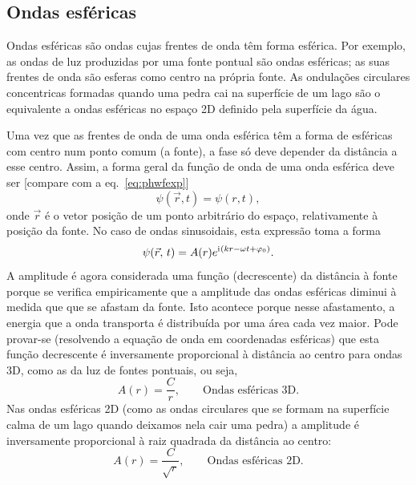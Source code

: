 \subsection{Ondas esféricas}
Ondas esféricas são ondas cujas frentes de onda têm forma esférica. Por exemplo,
as ondas de luz produzidas por uma fonte pontual são ondas esféricas; as suas
frentes de onda são esferas como centro na própria fonte. As ondulações
circulares concentricas formadas quando uma pedra cai na superfície de um lago
são o equivalente a ondas esféricas no espaço 2D definido pela superfície da
água.

Uma vez que as frentes de onda de uma onda esférica têm a forma de esféricas
com centro num ponto comum (a fonte), a fase só deve depender da distância a
esse centro. Assim, a forma geral da função de onda de uma onda
esférica deve ser [compare com a eq.~\eqref{eq:phwfexp}]
\begin{equation*}
\psi(\vec r,t)=\psi(r,t),
\end{equation*}
onde $\vec r$ é o vetor posição de um ponto arbitrário do espaço, relativamente
à posição da fonte. No caso de ondas sinusoidais, esta expressão toma a forma
\begin{equation}
\psi(\vec r,\,t)=A(r)e^{\iu(kr-\omega t+\varphi_0)}.
\end{equation}
A amplitude é agora considerada uma função (decrescente) da distância à fonte
porque se verifica empiricamente que a amplitude das ondas esféricas diminui à
medida que que se afastam da fonte. Isto acontece porque nesse afastamento, a
energia que a onda transporta é distribuída por uma área cada vez maior. Pode
provar-se (resolvendo a equação de onda em coordenadas esféricas) que esta
função decrescente é inversamente proporcional à distância ao centro para ondas
3D, como as da luz de fontes pontuais, ou seja,
\begin{equation*}
A(r)=\frac{C}{r},\qquad\text{Ondas esféricas 3D.}
\end{equation*}
Nas ondas esféricas 2D (como as ondas circulares que se formam na superfície
calma de um lago quando deixamos nela cair uma pedra) a amplitude é inversamente
proporcional à raiz quadrada da distância ao centro:
\begin{equation*}
A(r)=\frac{C}{\sqrt r},\qquad\text{Ondas esféricas 2D.}
\end{equation*}


